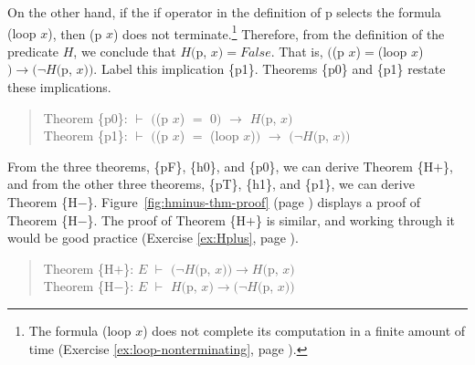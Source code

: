 On the other hand, if the \textsf{if} operator in the definition of \textsf{p}
selects the formula \textsf{(loop $x$)}, then (p $x$) 
does not terminate.\footnote{The formula \textsf{(loop $x$)} does not complete its
computation in a finite amount of time
(Exercise \ref{ex:loop-nonterminating}, page \pageref{ex:loop-nonterminating}).}
Therefore, from the definition of the predicate $H$,
we conclude that $H($p, $x)=False$. 
That is, $($\textsf{(p $x$)}$=$\textsf{(loop $x$)}$)\rightarrow(\neg H($\textsf{p}, $x))$.
Label this implication \{p1\}.
Theorems \{p0\} and \{p1\} restate these implications.

\begin{quote}
Theorem \{p0\}: $\vdash$  $($\textsf{(p $x$)} $=$ \textsf{0}$)$ $\rightarrow$ $H($\textsf{p}, $x)$ \\
Theorem \{p1\}: $\vdash$  $($\textsf{(p $x$)} $=$ \textsf{(loop $x$)}$)$ $\rightarrow$ $(\neg H($\textsf{p}, $x))$
\end{quote}

From the three theorems, \{pF\}, \{h0\}, and \{p0\},
we can derive Theorem \{H$+$\}, and
from the other three theorems, \{pT\}, \{h1\}, and \{p1\},
we can derive
Theorem \{H$-$\}.
Figure~\ref{fig:hminus-thm-proof} (page \pageref{fig:hminus-thm-proof}) displays
a proof of Theorem \{H$-$\}.
The proof of Theorem \{H$+$\} is similar, and working through it would be
good practice (Exercise \ref{ex:Hplus}, page \pageref{ex:Hplus}).

\begin{quote}
Theorem \{H$+$\}: $E$ $\vdash$ $(\neg H($\textsf{p}, $x)) \rightarrow H($\textsf{p}, $x)$ \\
Theorem \{H$-$\}: $E$ $\vdash$ $H($\textsf{p}, $x) \rightarrow (\neg H($\textsf{p}, $x))$
\end{quote}

